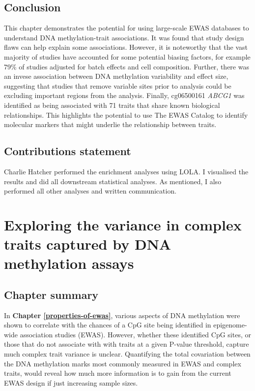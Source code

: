 \documentclass[11pt,oneside]{bristolthesis}
\begin{document}
\hypertarget{conclusion-04}{%
\section{Conclusion}\label{conclusion-04}}

This chapter demonstrates the potential for using large-scale EWAS databases to understand DNA methylation-trait associations. It was found that study design flaws can help explain some associations. However, it is noteworthy that the vast majority of studies have accounted for some potential biasing factors, for example 79\% of studies adjusted for batch effects and cell composition. Further, there was an invese association between DNA methylation variability and effect size, suggesting that studies that remove variable sites prior to analysis could be excluding important regions from the analysis. Finally, cg06500161 \emph{ABCG1} was identified as being associated with 71 traits that share known biological relationships. This highlights the potential to use The EWAS Catalog to identify molecular markers that might underlie the relationship between traits.

\hypertarget{contributions-statement-04}{%
\section{Contributions statement}\label{contributions-statement-04}}

Charlie Hatcher performed the enrichment analyses using LOLA. I visualised the results and did all downstream statistical analyses. As mentioned, I also performed all other analyses and written communication.

\hypertarget{h2ewas-chapter}{%
\chapter{Exploring the variance in complex traits captured by DNA methylation assays}\label{h2ewas-chapter}}

\hypertarget{chapter-summary-05}{%
\section{Chapter summary}\label{chapter-summary-05}}

In \textbf{Chapter \ref{properties-of-ewas}}, various aspects of DNA methylation were shown to correlate with the chances of a CpG site being identified in epigenome-wide association studies (EWAS). However, whether these identified CpG sites, or those that do not associate with with traits at a given P-value threshold, capture much complex trait variance is unclear. Quantifying the total covariation between the DNA methylation marks most commonly measured in EWAS and complex traits, would reveal how much more information is to gain from the current EWAS design if just increasing sample sizes.
\end{document}
